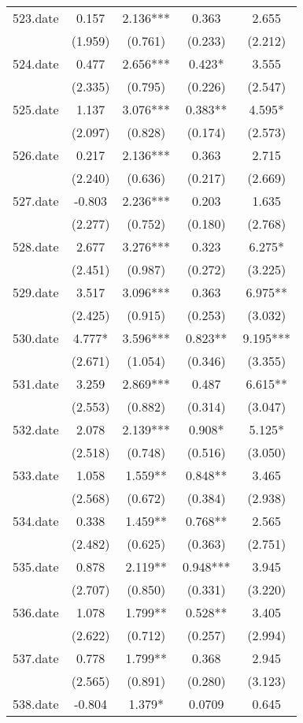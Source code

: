 \documentclass[]{article}
\begin{document}
\begin{tabular}{lcccc}
523.date & 0.157 & 2.136*** & 0.363 & 2.655 \\
 & (1.959) & (0.761) & (0.233) & (2.212) \\
524.date & 0.477 & 2.656*** & 0.423* & 3.555 \\
 & (2.335) & (0.795) & (0.226) & (2.547) \\
525.date & 1.137 & 3.076*** & 0.383** & 4.595* \\
 & (2.097) & (0.828) & (0.174) & (2.573) \\
526.date & 0.217 & 2.136*** & 0.363 & 2.715 \\
 & (2.240) & (0.636) & (0.217) & (2.669) \\
527.date & -0.803 & 2.236*** & 0.203 & 1.635 \\
 & (2.277) & (0.752) & (0.180) & (2.768) \\
528.date & 2.677 & 3.276*** & 0.323 & 6.275* \\
 & (2.451) & (0.987) & (0.272) & (3.225) \\
529.date & 3.517 & 3.096*** & 0.363 & 6.975** \\
 & (2.425) & (0.915) & (0.253) & (3.032) \\
530.date & 4.777* & 3.596*** & 0.823** & 9.195*** \\
 & (2.671) & (1.054) & (0.346) & (3.355) \\
531.date & 3.259 & 2.869*** & 0.487 & 6.615** \\
 & (2.553) & (0.882) & (0.314) & (3.047) \\
532.date & 2.078 & 2.139*** & 0.908* & 5.125* \\
 & (2.518) & (0.748) & (0.516) & (3.050) \\
533.date & 1.058 & 1.559** & 0.848** & 3.465 \\
 & (2.568) & (0.672) & (0.384) & (2.938) \\
534.date & 0.338 & 1.459** & 0.768** & 2.565 \\
 & (2.482) & (0.625) & (0.363) & (2.751) \\
535.date & 0.878 & 2.119** & 0.948*** & 3.945 \\
 & (2.707) & (0.850) & (0.331) & (3.220) \\
536.date & 1.078 & 1.799** & 0.528** & 3.405 \\
 & (2.622) & (0.712) & (0.257) & (2.994) \\
537.date & 0.778 & 1.799** & 0.368 & 2.945 \\
 & (2.565) & (0.891) & (0.280) & (3.123) \\
538.date & -0.804 & 1.379* & 0.0709 & 0.645 \\

\end{tabular}
\end{document}
